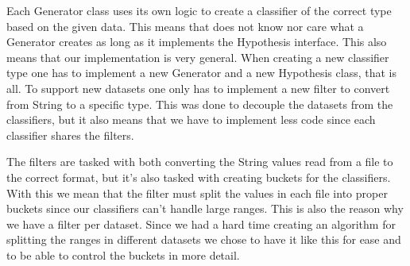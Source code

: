Each Generator class uses its own logic to create a classifier of the correct type
based on the given data. This means that \adaboost{} does not know nor care what
a Generator creates as long as it implements the Hypothesis interface. This also
means that our implementation is very general. When creating a new classifier type
one has to implement a new Generator and a new Hypothesis class, that is all. To
support new datasets one only has to implement a new filter to convert from String
to a specific type. This was done to decouple the datasets from the classifiers, but
it also means that we have to implement less code since each classifier shares the
filters.

The filters are tasked with both converting the String values read from a file to
the correct format, but it's also tasked with creating buckets for the classifiers.
With this we mean that the filter must split the values in each file into proper
buckets since our classifiers can't handle large ranges. This is also the reason
why we have a filter per dataset. Since we had a hard time creating an algorithm
for splitting the ranges in different datasets we chose to have it like this for ease
and to be able to control the buckets in more detail.
